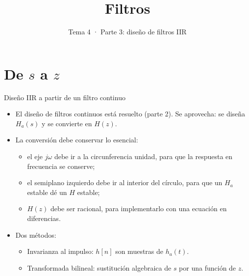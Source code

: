 \documentclass[aspectratio=169,11pt]{beamer}
\title[T4 · Filtros IIR]{Filtros}
\subtitle{Tema 4 · Parte 3: diseño de filtros IIR}
\begin{document}
\portada

\section{De $s$ a $z$}

\begin{frame}{Diseño IIR a partir de un filtro continuo}
  \begin{itemize}
    \item El diseño de filtros continuos está resuelto (parte 2). Se aprovecha: se diseña $H_a(s)$ y se convierte en $H(z)$.
    \item La conversión debe conservar lo esencial:
    \begin{itemize}
      \item el eje $j\omega$ debe ir a la circunferencia unidad, para que la respuesta en frecuencia se conserve;
      \item el semiplano izquierdo debe ir al interior del círculo, para que un $H_a$ estable dé un $H$ estable;
      \item $H(z)$ debe ser racional, para implementarlo con una ecuación en diferencias.
    \end{itemize}
    \item Dos métodos:
    \begin{itemize}
      \item \alert{Invarianza al impulso}: $h[n]$ son muestras de $h_a(t)$.
      \item \alert{Transformada bilineal}: sustitución algebraica de $s$ por una función de $z$.
    \end{itemize}
  \end{itemize}
\end{frame}
\end{document}
